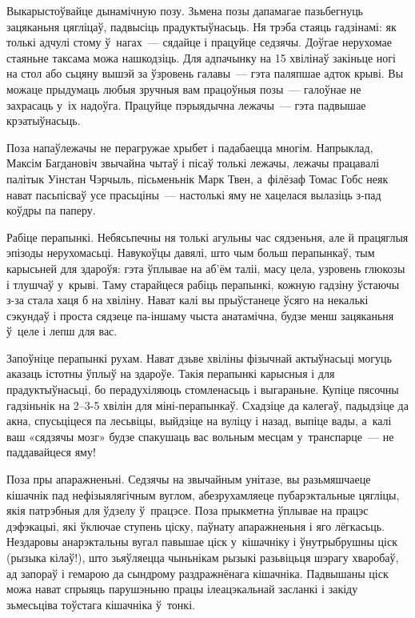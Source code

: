 Выкарыстоўвайце дынамічную позу. Зьмена позы дапамагае пазьбегнуць зацяканьня цягліцаў, падвысіць прадуктыўнасьць. Ня трэба стаяць гадзінамі: як толькі адчулі стому ў~нагах~--- сядайце і працуйце седзячы. Доўгае нерухомае стаяньне таксама можа нашкодзіць. Для адпачынку на 15 хвілінаў закіньце ногі на стол або сьцяну вышэй за ўзровень галавы~--- гэта паляпшае адток крыві. Вы можаце прыдумаць любыя зручныя вам працоўныя позы~--- галоўнае не захрасаць у~іх надоўга. Працуйце пэрыядычна лежачы~--- гэта падвышае крэатыўнасьць.

Поза напаўлежачы не перагружае хрыбет і падабаецца многім. Напрыклад, Максім Багдановіч звычайна чытаў і пісаў толькі лежачы, лежачы працавалі палітык Уінстан Чэрчыль, пісьменьнік Марк Твен, а~філёзаф Томас Гобс неяк нават пасьпісваў усе прасьціны~--- настолькі яму не хацелася вылазіць з-пад коўдры па паперу.

Рабіце перапынкі. Небясьпечны ня толькі агульны час сядзеньня, але й працяглыя эпізоды нерухомасьці. Навукоўцы давялі, што чым больш перапынкаў, тым карысьней для здароўя: гэта ўплывае на аб'ём таліі, масу цела, узровень глюкозы і тлушчаў у~крыві. Таму старайцеся рабіць перапынкі, кожную гадзіну ўстаючы з-за стала хаця б на хвіліну. Нават калі вы прыўстанеце ўсяго на некалькі сэкундаў і проста сядзеце па-іншаму чыста анатамічна, будзе менш зацяканьня ў~целе і лепш для вас.

Запоўніце перапынкі рухам. Нават дзьве хвіліны фізычнай актыўнасьці могуць аказаць істотны ўплыў на здароўе. Такія перапынкі карысныя і для прадуктыўнасьці, бо перадухіляюць стомленасьць і выгараньне. Купіце пясочны гадзіньнік на 2--3-5 хвілін для міні-перапынкаў. Схадзіце да калегаў, падыдзіце да акна, спусьціцеся па лесьвіцы, выйдзіце на вуліцу і назад, выпіце вады, а~калі ваш «сядзячы мозг» будзе спакушаць вас вольным месцам у~транспарце~--- не паддавайцеся яму!

Поза пры апаражненьні. Седзячы на звычайным унітазе, вы разьмяшчаеце кішачнік пад нефізыялягічным вуглом, абезрухамляеце пубарэктальные цягліцы, якія патрэбныя для ўдзелу ў~працэсе. Поза прыкметна ўплывае на працэс дэфэкацыі, які ўключае ступень ціску, паўнату апаражненьня і яго лёгкасьць. Нездаровы анарэктальны вугал павышае ціск у~кішачніку і ўнутрыбрушны ціск (рызыка кілаў!), што зьяўляецца чыньнікам рызыкі разьвіцьця шэрагу хваробаў, ад запораў і гемарою да сындрому раздражнёнага кішачніка. Падвышаны ціск можа нават спрыяць парушэньню працы ілеацэкальнай засланкі і закіду зьмесьціва тоўстага кішачніка ў~тонкі.

